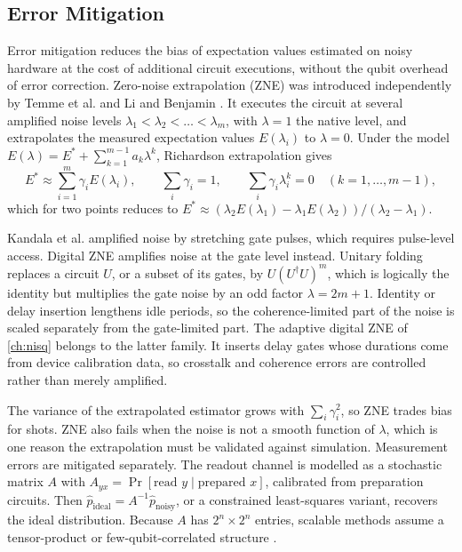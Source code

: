 \subsection{Error Mitigation}

Error mitigation reduces the bias of expectation values estimated on noisy hardware at the cost of additional circuit executions, without the qubit overhead of error correction. Zero-noise extrapolation (ZNE) was introduced independently by Temme et al. \cite{temme2017errormitigation} and Li and Benjamin \cite{li2017activeerror}. It executes the circuit at several amplified noise levels $\lambda_1<\lambda_2<\dots<\lambda_m$, with $\lambda=1$ the native level, and extrapolates the measured expectation values $E(\lambda_i)$ to $\lambda=0$. Under the model $E(\lambda)=E^{\ast}+\sum_{k=1}^{m-1}a_k\lambda^k$, Richardson extrapolation gives
\begin{equation}\label{eq:bg:zne}
E^{\ast}\approx\sum_{i=1}^{m}\gamma_iE(\lambda_i),\qquad \sum_{i}\gamma_i=1,\qquad \sum_{i}\gamma_i\lambda_i^{k}=0\quad(k=1,\dots,m-1),
\end{equation}
which for two points reduces to $E^{\ast}\approx(\lambda_2E(\lambda_1)-\lambda_1E(\lambda_2))/(\lambda_2-\lambda_1)$.

Kandala et al. \cite{kandala2019errormitigation} amplified noise by stretching gate pulses, which requires pulse-level access. Digital ZNE \cite{giurgicatiron2020digitalzne} amplifies noise at the gate level instead. Unitary folding replaces a circuit $U$, or a subset of its gates, by $U(U^{\dagger}U)^{m}$, which is logically the identity but multiplies the gate noise by an odd factor $\lambda=2m+1$. Identity or delay insertion lengthens idle periods, so the coherence-limited part of the noise is scaled separately from the gate-limited part. The adaptive digital ZNE of \cref{ch:nisq} \cite{guo2025deal} belongs to the latter family. It inserts delay gates whose durations come from device calibration data, so crosstalk and coherence errors are controlled rather than merely amplified.

The variance of the extrapolated estimator grows with $\sum_i\gamma_i^2$, so ZNE trades bias for shots. ZNE also fails when the noise is not a smooth function of $\lambda$, which is one reason the extrapolation must be validated against simulation. Measurement errors are mitigated separately. The readout channel is modelled as a stochastic matrix $A$ with $A_{yx}=\Pr[\text{read }y\mid\text{prepared }x]$, calibrated from preparation circuits. Then $\hat{p}_{\mathrm{ideal}}=A^{-1}\hat{p}_{\mathrm{noisy}}$, or a constrained least-squares variant, recovers the ideal distribution. Because $A$ has $2^n\times2^n$ entries, scalable methods assume a tensor-product or few-qubit-correlated structure \cite{bravyi2021measurement}.

